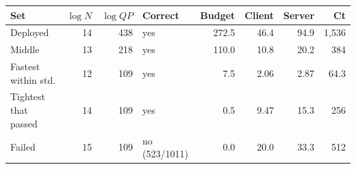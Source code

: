 \begin{tabular}{lrrlrrrr}
\hline
Set & $\log N$ & $\log QP$ & Correct & Budget & Client & Server & Ct \\
\hline
Deployed & 14 & 438 & yes & 272.5 & 46.4 & 94.9 & 1,536 \\
Middle & 13 & 218 & yes & 110.0 & 10.8 & 20.2 & 384 \\
Fastest within std. & 12 & 109 & yes & 7.5 & 2.06 & 2.87 & 64.3 \\
Tightest that passed & 14 & 109 & yes & 0.5 & 9.47 & 15.3 & 256 \\
Failed & 15 & 109 & no (523/1011) & 0.0 & 20.0 & 33.3 & 512 \\
\hline
\end{tabular}
